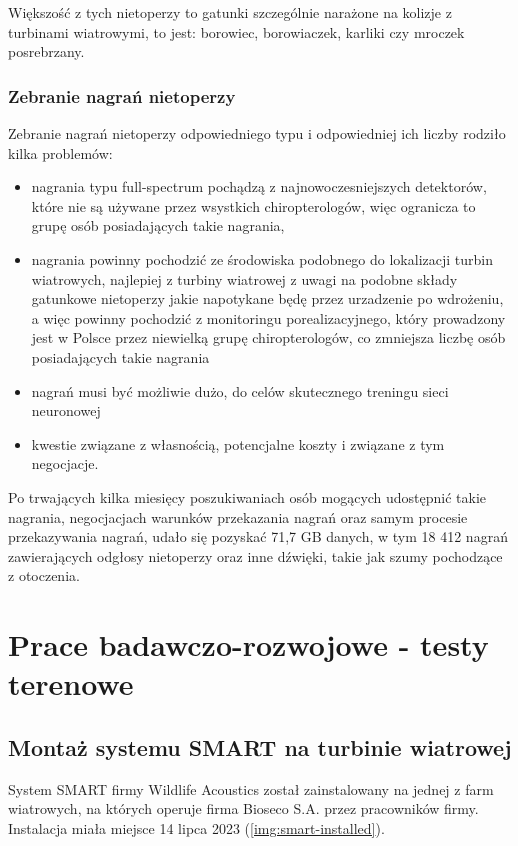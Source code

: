 \documentclass{sprz}
\begin{document}
Większość z tych nietoperzy to gatunki szczególnie narażone na kolizje z turbinami wiatrowymi, to jest: borowiec, borowiaczek, karliki czy mroczek posrebrzany.

\subsection{Zebranie nagrań nietoperzy}
Zebranie nagrań nietoperzy odpowiedniego typu i odpowiedniej ich liczby rodziło kilka problemów:
\begin{itemize}
  \item{nagrania typu full-spectrum pochądzą z najnowoczesniejszych detektorów, które nie są używane przez wsystkich chiropterologów, więc ogranicza to grupę osób posiadających takie nagrania,}
  \item{nagrania powinny pochodzić ze środowiska podobnego do lokalizacji turbin wiatrowych, najlepiej z turbiny wiatrowej z uwagi na podobne składy gatunkowe nietoperzy jakie napotykane będę przez urzadzenie po wdrożeniu, a więc powinny pochodzić z monitoringu porealizacyjnego, który prowadzony jest w Polsce przez niewielką grupę chiropterologów, co zmniejsza liczbę osób posiadających takie nagrania}
  \item{nagrań musi być możliwie dużo, do celów skutecznego treningu sieci neuronowej}
  \item{kwestie związane z własnością, potencjalne koszty i związane z tym negocjacje.}
\end{itemize}

Po trwających kilka miesięcy poszukiwaniach osób mogących udostępnić takie nagrania, negocjacjach warunków przekazania nagrań oraz samym procesie przekazywania nagrań, udało się pozyskać 71,7 GB danych, w tym 18 412 nagrań zawierających odgłosy nietoperzy oraz inne dźwięki, takie jak szumy pochodzące z otoczenia.

\chapter{Prace badawczo-rozwojowe - testy terenowe}

\section{Montaż systemu SMART na turbinie wiatrowej}
System SMART firmy Wildlife Acoustics został zainstalowany na jednej z farm wiatrowych, na których operuje firma Bioseco S.A. przez pracowników firmy. Instalacja miała miejsce 14 lipca 2023 (\ref{img:smart-installed}). 
\end{document}
